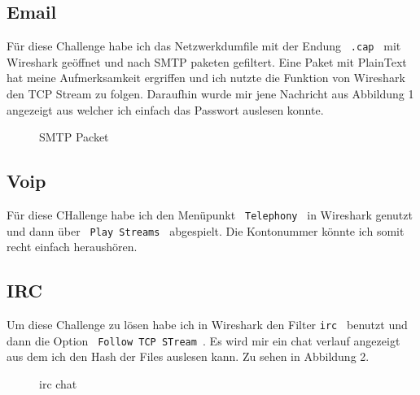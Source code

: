 \documentclass[12pt,a4paper,titlepage,oneside]{scrartcl}
\begin{document}
\subsection{Email}

Für diese Challenge habe ich das Netzwerkdumfile mit der Endung \lstinline{ .cap }  mit Wireshark geöffnet und nach SMTP paketen gefiltert. Eine Paket mit PlainText hat meine Aufmerksamkeit ergriffen und ich nutzte die Funktion von Wireshark den TCP Stream zu folgen. Daraufhin wurde mir jene Nachricht aus Abbildung 1 angezeigt aus welcher ich einfach das Passwort auslesen konnte.

\begin{figure}[h!]
  \centering
  \caption{SMTP Packet}
  \label{fig:Abilldung 1}
\end{figure}


\subsection{Voip}
Für diese CHallenge habe ich den Menüpunkt \lstinline{ Telephony } in Wireshark genutzt und dann über \lstinline{ Play Streams } abgespielt. Die Kontonummer könnte ich somit recht einfach heraushören. 


\subsection{IRC}
Um diese Challenge zu lösen habe ich in Wireshark den Filter \lstinline{irc } benutzt und dann die Option \lstinline{ Follow TCP STream }. Es wird mir ein chat verlauf angezeigt aus dem ich den Hash der Files auslesen kann. Zu sehen in Abbildung 2.

\begin{figure}[h!]
  \centering
  \caption{irc chat}
  \label{fig:Abilldung 2}
\end{figure}
\end{document}
